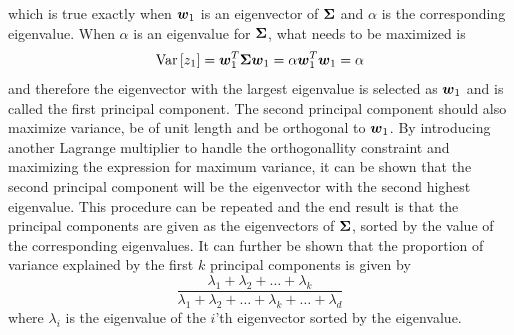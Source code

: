 which is true exactly when $\boldsymbol{w}_1$ is an eigenvector of $\boldsymbol{\Sigma}$ and $\alpha$ is the corresponding eigenvalue. When $\alpha$ is an eigenvalue for $\boldsymbol{\Sigma}$, what needs to be maximized is
\[
    \text{Var}\,[z_1] = \boldsymbol{w}_1^T\boldsymbol{\Sigma}\boldsymbol{w}_1 = \alpha\boldsymbol{w}_1^T\boldsymbol{w}_1 = \alpha
\]
and therefore the eigenvector with the largest eigenvalue is selected as $\boldsymbol{w}_1$ and is called the first principal component. The second principal component should also maximize variance, be of unit length and be orthogonal to $\boldsymbol{w}_1$. By introducing another Lagrange multiplier to handle the orthogonallity constraint and maximizing the expression for maximum variance, it can be shown that the second principal component will be the eigenvector with the second highest eigenvalue. This procedure can be repeated and the end result is that the principal components are given as the eigenvectors of $\boldsymbol{\Sigma}$, sorted by the value of the corresponding eigenvalues. It can further be shown that the proportion of variance explained by the first $k$ principal components is given by
\begin{equation}\label{eq:variance-explained}
    \frac{\lambda_1+\lambda_2 +\dots + \lambda_k}{\lambda_1 + \lambda_2 + \dots + \lambda_k + \dots + \lambda_d}
\end{equation}
where $\lambda_i$ is the eigenvalue of the $i$'th eigenvector sorted by the eigenvalue.


